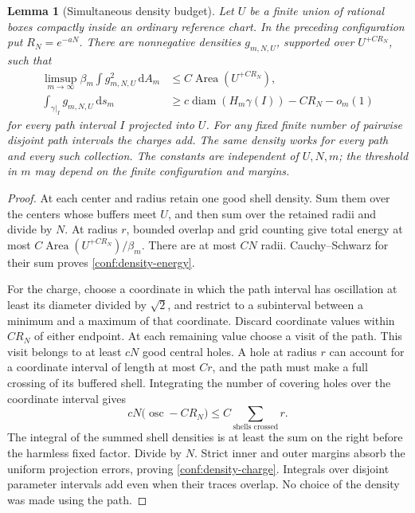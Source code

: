 \documentclass[11pt]{article}
\numberwithin{equation}{section}
\newtheorem{lemma}[theorem]{Lemma}
\theoremstyle{definition}
\theoremstyle{remark}
\newcommand{\1}{\mathbf 1}
\begin{document}
\begin{lemma}[Simultaneous density budget]
\label{conf:density-budget}
Let \(U\) be a finite union of rational boxes compactly inside an
ordinary reference chart.  In the preceding configuration put
\(R_N=e^{-aN}\).  There are nonnegative densities \(g_{m,N,U}\),
supported over \(U^{+CR_N}\), such that
\begin{align}
 \limsup_{m\to\infty}\beta_m
       \int g_{m,N,U}^{2}\,\mathrm d A_m
       &\le C\operatorname{Area}(U^{+CR_N}),
       \label{conf:density-energy}\\
 \int_{\gamma|_I}g_{m,N,U}\,\mathrm d s_m
       &\ge c\operatorname{diam}(H_m\gamma(I))-CR_N-o_m(1)
       \label{conf:density-charge}
\end{align}
for every path interval \(I\) projected into \(U\).
For any fixed finite number of pairwise disjoint path intervals the
charges add.  The same density works for every path and every such
collection.  The constants are independent of \(U,N,m\); the
threshold in \(m\) may depend on the finite configuration and margins.
\end{lemma}

\begin{proof}
At each center and radius retain one good shell density.  Sum them over
the centers whose buffers meet \(U\), and then sum over the retained
radii and divide by \(N\).  At radius \(r\), bounded overlap and
grid counting give total energy at most
\(C\operatorname{Area}(U^{+CR_N})/\beta_m\).  There are at most \(CN\) radii.
Cauchy--Schwarz for their sum proves
\eqref{conf:density-energy}.

For the charge, choose a coordinate in which the path interval has
oscillation at least its diameter divided by \(\sqrt2\), and restrict
to a subinterval between a minimum and a maximum of that coordinate.
Discard coordinate values within \(CR_N\) of either endpoint.  At
each remaining value choose a visit of the path.  This visit belongs
to at least \(cN\) good central holes.  A hole at radius \(r\) can
account for a coordinate interval of length at most \(Cr\), and the
path must make a full crossing of its buffered shell.  Integrating the
number of covering holes over the coordinate interval gives
\[
 cN\bigl(\operatorname{osc}-CR_N\bigr)
       \le C\sum_{\text{shells crossed}}r.
\]
The integral of the summed shell densities is at least the sum on the
right before the harmless fixed factor.  Divide by \(N\).  Strict
inner and outer margins absorb the uniform projection errors, proving
\eqref{conf:density-charge}.  Integrals over disjoint parameter
intervals add even when their traces overlap.  No choice of the density
was made using the path.
\end{proof}
\end{document}
